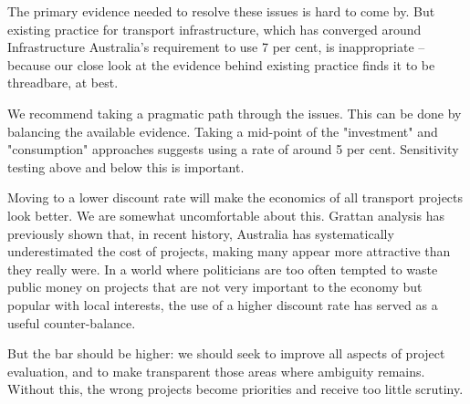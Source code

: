 \begin{overview}
The primary evidence needed to resolve these issues is hard to come by. But existing practice for transport infrastructure, which has converged around Infrastructure Australia’s requirement to use 7 per cent, is inappropriate -- because our close look at the evidence behind existing practice finds it to be threadbare, at best.

We recommend taking a pragmatic path through the issues. This can be done by balancing the available evidence. Taking a mid-point of the "investment" and "consumption" approaches suggests using a rate of around 5 per cent. Sensitivity testing above and below this is important.  

Moving to a lower discount rate will make the economics of all transport projects look better. We are somewhat uncomfortable about this. Grattan analysis has previously shown that, in recent history, Australia has systematically underestimated the cost of projects, making many appear more attractive than they really were. In a world where politicians are too often tempted to waste public money on projects that are not very important to the economy but popular with local interests, the use of a higher discount rate has served as a useful counter-balance. 

But the bar should be higher: we should seek to improve all aspects of project evaluation, and to make transparent those areas where ambiguity remains. Without this, the wrong projects become priorities and receive too little scrutiny. 

\end{overview}
